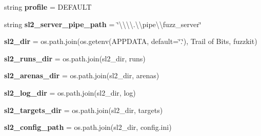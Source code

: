 \begin{DoxyCompactItemize}
\item 
\mbox{\label{namespaceharness_1_1config_aed4fc2b76527bed03f076cbe60801273}} 
string {\bfseries profile} = \textquotesingle{}D\+E\+F\+A\+U\+LT\textquotesingle{}
\item 
\mbox{\label{namespaceharness_1_1config_ad29dbb3d4b8de6ed86dbb0a3d1e08d7a}} 
string {\bfseries sl2\+\_\+server\+\_\+pipe\+\_\+path} = \char`\"{}\textbackslash{}\textbackslash{}\textbackslash{}\textbackslash{}.\textbackslash{}\textbackslash{}pipe\textbackslash{}\textbackslash{}fuzz\+\_\+server\char`\"{}
\item 
\mbox{\label{namespaceharness_1_1config_a45a81df0886d587efbe9413c08827b09}} 
{\bfseries sl2\+\_\+dir} = os.\+path.\+join(os.\+getenv(\textquotesingle{}A\+P\+P\+D\+A\+TA\textquotesingle{}, default=\char`\"{}.\char`\"{}), \textquotesingle{}Trail of Bits\textquotesingle{}, \textquotesingle{}fuzzkit\textquotesingle{})
\item 
\mbox{\label{namespaceharness_1_1config_a5940f2a3ef8475b9de174706784173a1}} 
{\bfseries sl2\+\_\+runs\+\_\+dir} = os.\+path.\+join(sl2\+\_\+dir, \textquotesingle{}runs\textquotesingle{})
\item 
\mbox{\label{namespaceharness_1_1config_a2acc1278d43533786bdf6a497bdcbb44}} 
{\bfseries sl2\+\_\+arenas\+\_\+dir} = os.\+path.\+join(sl2\+\_\+dir, \textquotesingle{}arenas\textquotesingle{})
\item 
\mbox{\label{namespaceharness_1_1config_a1411d1d406c021b4c5e81953404bdc4b}} 
{\bfseries sl2\+\_\+log\+\_\+dir} = os.\+path.\+join(sl2\+\_\+dir, \textquotesingle{}log\textquotesingle{})
\item 
\mbox{\label{namespaceharness_1_1config_a3287ec823dd463a2e8a4b7f5baa0e418}} 
{\bfseries sl2\+\_\+targets\+\_\+dir} = os.\+path.\+join(sl2\+\_\+dir, \textquotesingle{}targets\textquotesingle{})
\item 
\mbox{\label{namespaceharness_1_1config_ad8e5daefd60cc7e49fd271e4d9e62dd4}} 
{\bfseries sl2\+\_\+config\+\_\+path} = os.\+path.\+join(sl2\+\_\+dir, \textquotesingle{}config.\+ini\textquotesingle{})

\end{DoxyCompactItemize}
